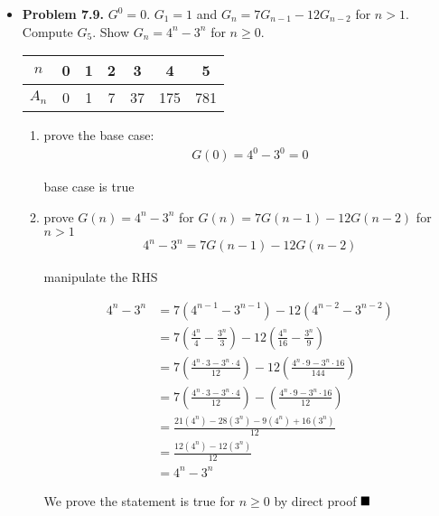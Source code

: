 \documentclass{article}
\begin{document}
    \begin{itemize}
        \item \textbf{Problem 7.9.} $G^0 = 0$. $G_1 = 1$ and $G_n = 7G_{n-1} - 12 G_{n-2}$ for $n > 1$. Compute $G_5$. Show $G_n = 4^n - 3^n$ for $n \geq 0$.\\
        \begin{tabular}{ |c|c|c|c|c|c|c| } 
            \hline
            $n$ & 0 & 1 & 2 & 3 & 4 & 5\\ 
            \hline
            $A_n$ & 0 & 1 & 7 & 37 & 175 & 781 \\
            \hline
        \end{tabular}
        \begin{enumerate}[label=(\roman*)]
            \item prove the base case:
            \begin{align*}
                G(0) = 4^0 - 3^0 = 0
            \end{align*}
            \begin{center}
                base case is true
            \end{center}
            \item prove $G(n) = 4^n - 3^n$ for $G(n) = 7G(n-1) - 12G(n-2)$ for $n>1$
            \begin{align*}
                4^n - 3^n = 7G(n-1) - 12G(n-2)
            \end{align*}
            \begin{center}
                manipulate the RHS
            \end{center}
            \begin{align*}
                4^n - 3^n &= 7(4^{n-1} - 3^{n-1}) - 12(4^{n-2} - 3^{n-2})\\
                          &= 7 (\frac{4^n}{4} - \frac{3^n}{3}) - 12(\frac{4^n}{16} - \frac{3^n}{9})\\
                          &= 7(\frac{4^n \cdot 3 - 3^n \cdot 4}{12}) - 12(\frac{4^n \cdot 9 - 3^n \cdot 16}{144})\\
                          &= 7(\frac{4^n \cdot 3 - 3^n \cdot 4}{12}) - (\frac{4^n \cdot 9 - 3^n \cdot 16}{12})\\
                          &= \frac{21(4^n) - 28(3^n) - 9(4^n) + 16(3^n)}{12}\\
                          &= \frac{12(4^n) - 12(3^n)}{12}\\
                          &= 4^n - 3^n
            \end{align*}
            \begin{center}
                We prove the statement is true for $n \geq 0$ by direct proof $\hfill\blacksquare$
            \end{center}


\end{enumerate}
\end{itemize}
\end{document}
